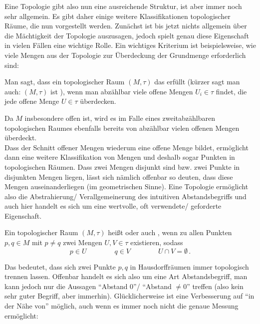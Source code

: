 \documentclass[../H_Analysis_main.tex]{subfiles}
\begin{document}
Eine Topologie gibt also nun eine ausreichende Struktur, ist aber immer noch sehr allgemein. Es gibt daher einige weitere Klassifikationen topologischer Räume, die nun vorgestellt werden. Zunächst ist bis jetzt nichts allgemein über die Mächtigkeit der Topologie auszusagen, jedoch spielt genau diese Eigenschaft in vielen Fällen eine wichtige Rolle. Ein wichtiges Kriterium ist beispielsweise, wie viele Mengen aus der Topologie zur Überdeckung der Grundmenge erforderlich sind:

\begin{defi}
Man sagt, dass ein topologischer Raum $(M, \tau)$ das  erfüllt (kürzer sagt man auch: $(M, \tau)$ ist ), wenn man abzählbar viele offene Mengen $U_i \in \tau$ findet, die jede offene Menge $U \in \tau$ überdecken.
\end{defi}

Da $M$ insbesondere offen ist, wird es im Falle eines zweitabzählbaren topologischen Raumes ebenfalls bereits von abzählbar vielen offenen Mengen überdeckt.\\

Dass der Schnitt offener Mengen wiederum eine offene Menge bildet, ermöglicht dann eine weitere Klassifikation von Mengen und deshalb sogar Punkten in topologischen Räumen. Dass zwei Mengen disjunkt sind bzw. zwei Punkte in disjunkten Mengen liegen, lässt sich nämlich offenbar so deuten, dass diese Mengen auseinanderliegen (im geometrischen Sinne). Eine Topologie ermöglicht also die Abstrahierung/ Verallgemeinerung des intuitiven Abstandsbegriffs und auch hier handelt es sich um eine wertvolle, oft verwendete/ geforderte Eigenschaft.

\begin{defi}[Hausdorffraum]
Ein topologischer Raum $(M, \tau)$ heißt  oder auch , wenn zu allen Punkten $p, q \in M$ mit $p \neq q$ zwei Mengen $U, V \in \tau$ existieren, sodass
\begin{equation*}
p \in U \qquad \qquad q \in V \qquad \qquad U \cap V = \emptyset \, .
\end{equation*}
\end{defi}

Das bedeutet, dass sich zwei Punkte $p, q$ in Hausdorffräumen immer topologisch trennen lassen. Offenbar handelt es sich also um eine Art Abstandsbegriff, man kann jedoch nur die Aussagen \enquote{Abstand 0}/ \enquote{Abstand $\neq 0$} treffen (also kein sehr guter Begriff, aber immerhin). Glücklicherweise ist eine Verbesserung auf \enquote{in der Nähe von} möglich, auch wenn es immer noch nicht die genaue Messung ermöglicht:
\end{document}
